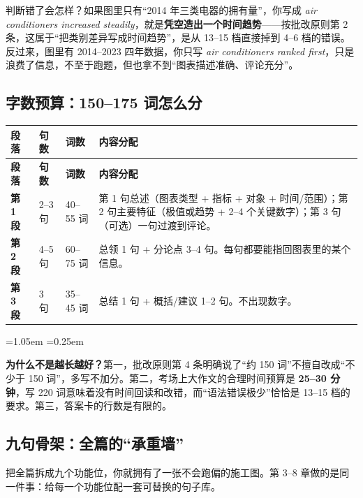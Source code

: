 \documentclass[11pt,a4paper]{ctexart}
\newcommand{\en}[1]{\textit{#1}}
\newcommand{\zone}[1]{\par\addvspace{3pt}\noindent{\bfseries\color{accent}【雷区】}#1\par\addvspace{3pt}}
\newenvironment{note}{%
  \par\addvspace{5pt}%
  \begin{list}{}{\leftmargin=1.05em \rightmargin=0.25em \listparindent=0pt
    \itemindent=0pt \topsep=0pt \parsep=2pt \itemsep=2pt \partopsep=0pt}%
  \item\relax\small\color{ink}%
}{%
  \end{list}\addvspace{5pt}%
}
\begin{document}
\zone{判断错了会怎样？如果图里只有“2014 年三类电器的拥有量”，你写成 \en{air conditioners increased steadily}，就是\textbf{凭空造出一个时间趋势}——按批改原则第 2 条，这属于“把类别差异写成时间趋势”，是从 13--15 档直接掉到 4--6 档的错误。反过来，图里有 2014--2023 四年数据，你只写 \en{air conditioners ranked first}，只是浪费了信息，不至于跑题，但也拿不到“图表描述准确、评论充分”。}

\subsection{字数预算：150--175 词怎么分}

\begin{longtable}{C{1.6cm} C{1.9cm} C{1.9cm} L{9.4cm}}
\toprule
\textbf{段落} & \textbf{句数} & \textbf{词数} & \textbf{内容分配}\\
\midrule
\endfirsthead
\toprule
\textbf{段落} & \textbf{句数} & \textbf{词数} & \textbf{内容分配}\\
\midrule
\endhead
\textbf{第 1 段} & 2--3 句 & 40--55 词 & 第 1 句总述（图表类型 + 指标 + 对象 + 时间/范围）；第 2 句主要特征（极值或趋势 + 2--4 个关键数字）；第 3 句（可选）一句过渡到评论。\\
\midrule
\textbf{第 2 段} & 4--5 句 & 60--75 词 & 总领 1 句 + 分论点 3--4 句。每句都要能指回图表里的某个信息。\\
\midrule
\textbf{第 3 段} & 3 句 & 35--45 词 & 总结 1 句 + 概括/建议 1--2 句。不出现数字。\\
\bottomrule
\end{longtable}

\begin{note}
\textbf{为什么不是越长越好？}第一，批改原则第 4 条明确说了“约 150 词”不擅自改成“不少于 150 词”，多写不加分。第二，考场上大作文的合理时间预算是 \textbf{25--30 分钟}，写 220 词意味着没有时间回读和改错，而“语法错误极少”恰恰是 13--15 档的要求。第三，答案卡的行数是有限的。
\end{note}

\subsection{九句骨架：全篇的“承重墙”}

把全篇拆成九个功能位，你就拥有了一张不会跑偏的施工图。第 3--8 章做的是同一件事：给每一个功能位配一套可替换的句子库。
\end{document}
